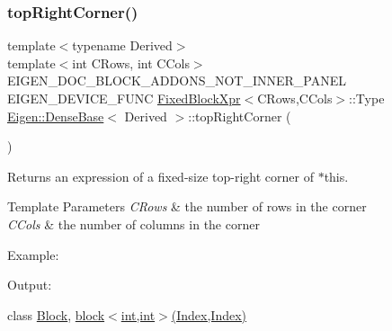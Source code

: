 \subsubsection{\texorpdfstring{topRightCorner()}{topRightCorner()}\hspace{0.1cm}{\footnotesize\ttfamily [2/3]}}
{\footnotesize\ttfamily template$<$typename Derived$>$ \\
template$<$int C\+Rows, int C\+Cols$>$ \\
E\+I\+G\+E\+N\+\_\+\+D\+O\+C\+\_\+\+B\+L\+O\+C\+K\+\_\+\+A\+D\+D\+O\+N\+S\+\_\+\+N\+O\+T\+\_\+\+I\+N\+N\+E\+R\+\_\+\+P\+A\+N\+EL E\+I\+G\+E\+N\+\_\+\+D\+E\+V\+I\+C\+E\+\_\+\+F\+U\+NC \mbox{\hyperlink{struct_eigen_1_1_dense_base_1_1_fixed_block_xpr}{Fixed\+Block\+Xpr}}$<$C\+Rows,C\+Cols$>$\+::Type \mbox{\hyperlink{class_eigen_1_1_dense_base}{Eigen\+::\+Dense\+Base}}$<$ Derived $>$\+::top\+Right\+Corner (\begin{DoxyParamCaption}{ }\end{DoxyParamCaption})\hspace{0.3cm}{\ttfamily [inline]}}

\begin{DoxyReturn}{Returns}
an expression of a fixed-\/size top-\/right corner of $\ast$this.
\end{DoxyReturn}

\begin{DoxyTemplParams}{Template Parameters}
{\em C\+Rows} & the number of rows in the corner \\
\hline
{\em C\+Cols} & the number of columns in the corner\\
\hline
\end{DoxyTemplParams}
Example\+: 
\begin{DoxyCodeInclude}{0}
\end{DoxyCodeInclude}
 Output\+: 
\begin{DoxyVerbInclude}
\end{DoxyVerbInclude}
 class \mbox{\hyperlink{class_eigen_1_1_block}{Block}}, \mbox{\hyperlink{class_eigen_1_1_dense_base_adfadb0b888358ae1f521cc0a106ddb85}{block$<$int,int$>$(\+Index,\+Index)}} \mbox{\label{class_eigen_1_1_dense_base_ac52cb78b12c5e5340f1ebdf3dd53e365}} 
